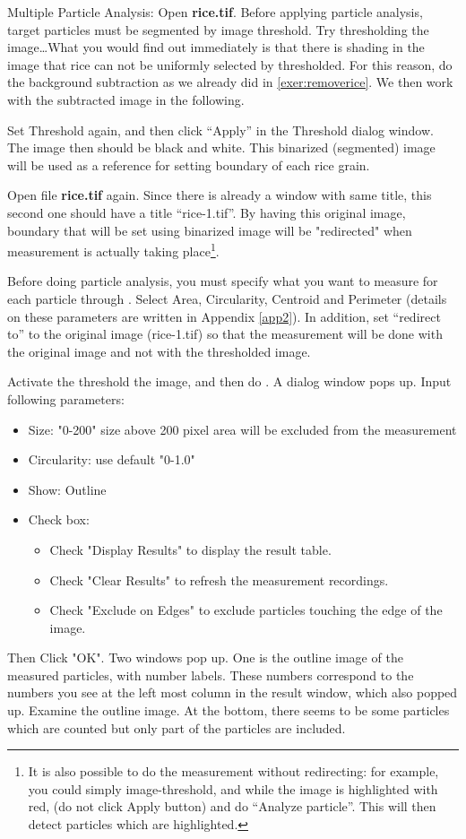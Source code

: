 \begin{indentexercise}{2}
\item Multiple Particle Analysis: Open \textbf{rice.tif}. Before applying particle analysis, target
particles must be segmented by image threshold. Try thresholding the
image\ldots What you would find out immediately is that there is shading in
the image that rice can not be uniformly selected by thresholded. For this reason, do the
background subtraction as we already did in \ref{exer:removerice}. 
We then work with the subtracted image in the
following.

Set Threshold again, and then click ``Apply'' in the Threshold dialog window. 
The image then should be black and white. This binarized (segmented) image 
will be used as a reference for setting boundary of each rice grain. 

Open file \textbf{rice.tif} again. Since there is already a window with same title, this second one 
should have a title ``rice-1.tif''. By having this original image, boundary that will be set using binarized image 
will be "redirected" when measurement is actually taking place\footnote{ It is also possible to 
do the measurement without redirecting: for example, you could simply image-threshold, and while the image is highlighted with red, (do not click Apply button) and do ``Analyze particle''. This will then detect particles which are highlighted.}. 

Before doing particle analysis, you must specify what you want to
measure for each particle through . Select Area, Circularity, Centroid and Perimeter
(details on these parameters are written in Appendix \ref{app2}).
In addition, set ``redirect to'' to the original image (rice-1.tif) so
that the measurement will be done with the original image and not with 
the thresholded image. 

Activate the threshold the image, and then do . A dialog window pops up. Input following
parameters:
\begin{itemize}
\item Size: "0-200" size above 200 pixel area will be excluded from the measurement
\item Circularity: use default "0-1.0"
\item Show: Outline
\item Check box:
\begin{itemize} 
\item Check "Display Results" to display the result table.
\item Check "Clear Results" to refresh the measurement recordings.
\item Check "Exclude on Edges" to exclude particles touching the edge of the image. 
\end{itemize}
\end{itemize}
Then Click "OK". Two windows pop up. One
is the outline image of the measured particles, with number labels.
These numbers correspond to the numbers you see at the left most column
in the result window, which also popped up. Examine the outline image.
At the bottom, there seems to be some particles which are counted but
only part of the particles are included. 


\end{indentexercise}

